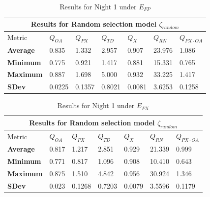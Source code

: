 \clearpage
\begin{table}[p]
\begin{center}
\begin{tabular}{lllllll}
\toprule
\multicolumn{7}{c}{Results for Random selection model $\zeta_{random}$} \\
\midrule
Metric & $Q_{OA}$ & $Q_{PX}$ & $Q_{TD}$ & $Q_{X}$ & $Q_{RN}$ & $Q_{PX \cdot OA}$ \\
\midrule
{\bf Average} & 0.835  & 1.332  & 2.957  & 0.907  & 23.976 & 1.086\\
{\bf Minimum} & 0.775  & 0.921  & 1.417  & 0.881  & 15.331 & 0.765\\
{\bf Maximum} & 0.887  & 1.698  & 5.000  & 0.932  & 33.225 & 1.417\\
{\bf SDev}    & 0.0225 & 0.1357 & 0.8021 & 0.0081 & 3.6253 & 0.1258\\
\bottomrule
\end{tabular}
\end{center}
\caption{Results for Night 1 under $E_{FP}$}
\label{tab:rand_1fp}
\end{table}

\begin{table}
\begin{center}
\begin{tabular}{lllllll}
\toprule
\multicolumn{7}{c}{Results for Random selection model $\zeta_{random}$} \\
\midrule
Metric & $Q_{OA}$ & $Q_{PX}$ & $Q_{TD}$ & $Q_{X}$ & $Q_{RN}$ & $Q_{PX \cdot OA}$ \\
\midrule
{\bf Average} & 0.817  & 1.217  & 2.851  & 0.929  & 21.339 & 0.999\\
{\bf Minimum} & 0.771  & 0.817  & 1.096  & 0.908  & 10.410 & 0.643\\
{\bf Maximum} & 0.875  & 1.510  & 4.842  & 0.956  & 30.924 & 1.346\\
{\bf SDev}    & 0.023  & 0.1268 & 0.7203 & 0.0079 & 3.5596 & 0.1179\\
\bottomrule
\end{tabular}
\end{center}
\caption{Results for Night 1 under $E_{FX}$}
\label{tab:rand_1fx}
\end{table}

